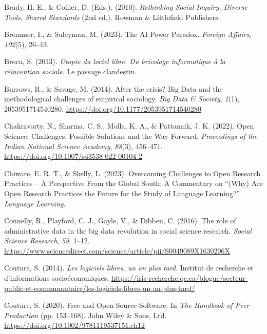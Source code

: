 \documentclass[
  letterpaper,
  DIV=11,
  numbers=noendperiod]{scrreprt}
\newlength{\cslhangindent}
\newenvironment{CSLReferences}[2] %
 {\begin{list}{}{%
  \setlength{\itemindent}{0pt}
  \setlength{\leftmargin}{0pt}
  \setlength{\parsep}{0pt}
  \ifodd #1
   \setlength{\leftmargin}{\cslhangindent}
   \setlength{\itemindent}{-1\cslhangindent}
  \fi
  \setlength{\itemsep}{#2\baselineskip}}}
 {\end{list}}
\begin{document}
\begin{CSLReferences}{1}{0}
Brady, H. E., \& Collier, D. (Eds.). (2010). \emph{Rethinking {Social
Inquiry}. {Diverse Tools}, {Shared Standards}} (2nd ed.). Rowman \&
Littlefield Publishers.

Bremmer, I., \& Suleyman, M. (2023). The {AI Power Paradox}.
\emph{Foreign Affairs}, \emph{102}(5), 26--43.

Broca, S. (2013). \emph{Utopie du lociel libre. {Du} bricolage
informatique à la réinvention sociale.} Le passage clandestin.

Burrows, R., \& Savage, M. (2014). After the crisis? {Big Data} and the
methodological challenges of empirical sociology. \emph{Big Data \&
Society}, \emph{1}(1), 2053951714540280.
\url{https://doi.org/10.1177/2053951714540280}

Chakravorty, N., Sharma, C. S., Molla, K. A., \& Pattanaik, J. K.
(2022). Open {Science}: {Challenges}, {Possible Solutions} and the {Way
Forward}. \emph{Proceedings of the Indian National Science Academy},
\emph{88}(3), 456--471. \url{https://doi.org/10.1007/s43538-022-00104-2}

Chiware, E. R. T., \& Skelly, L. (2023). Overcoming {Challenges} to
{Open Research Practices} -- {A Perspective From} the {Global South}: {A
Commentary} on {``({Why}) {Are Open Research Practices} the {Future} for
the {Study} of {Language Learning}?''} \emph{Language Learning}.

Connelly, R., Playford, C. J., Gayle, V., \& Dibben, C. (2016). The role
of administrative data in the big data revolution in social science
research. \emph{Social Science Research}, \emph{59}, 1--12.
\url{https://www.sciencedirect.com/science/article/pii/S0049089X1630206X}

Couture, S. (2014). \emph{Les logiciels libres, un an plus tard}.
Institut de recherche et d'informations socioéconomiques.
\url{https://iris-recherche.qc.ca/blogue/secteur-public-et-communautaire/les-logiciels-libres-un-an-plus-tard/}

Couture, S. (2020). Free and {Open Source Software}. In \emph{The
{Handbook} of {Peer Production}} (pp. 153--168). John Wiley \& Sons,
Ltd. \url{https://doi.org/10.1002/9781119537151.ch12}


\end{CSLReferences}
\end{document}
